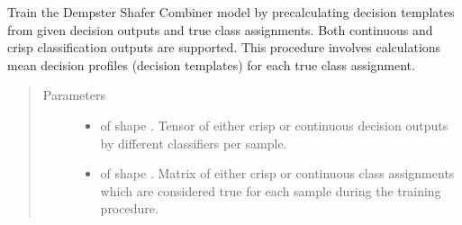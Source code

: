 \documentclass[letterpaper,10pt,english]{sphinxmanual}
\begin{document}
\begin{fulllineitems}
\begin{fulllineitems}
\label{\detokenize{pusion.core.dempster_shafer_combiner:pusion.core.dempster_shafer_combiner.DempsterShaferCombiner.train}}
\sphinxAtStartPar
Train the Dempster Shafer Combiner model by precalculating decision templates from given decision outputs and
true class assignments. Both continuous and crisp classification outputs are supported. This procedure involves
calculations mean decision profiles (decision templates) for each true class assignment.
\begin{quote}\begin{description}
\item[{Parameters}] \leavevmode\begin{itemize}
\item {} 
\sphinxAtStartPar
{} \textendash{}  of shape .
Tensor of either crisp or continuous decision outputs by different classifiers per sample.

\item {} 
\sphinxAtStartPar
{} \textendash{}  of shape .
Matrix of either crisp or continuous class assignments which are considered true for each sample during
the training procedure.

\end{itemize}

\end{description}\end{quote}

\end{fulllineitems}



\end{fulllineitems}
\end{document}
